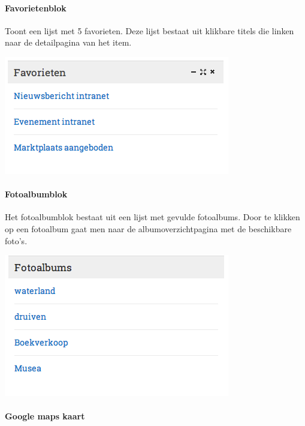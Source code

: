 \paragraph{Favorietenblok}

Toont een lijst met 5 favorieten. Deze lijst bestaat uit klikbare titels die linken naar de detailpagina van het item.

\begin{center}
	\includegraphics[scale=0.5]{img/blokken/favorieten.png}
\end{center}

\paragraph{Fotoalbumblok}\label{fotoalbumblok}

Het fotoalbumblok bestaat uit een lijst met gevulde fotoalbums. Door te klikken op een fotoalbum gaat men naar de albumoverzichtpagina met de beschikbare foto's.

\begin{center}
	\includegraphics[scale=0.5]{img/blokken/fotoalbum.png}
\end{center}

\paragraph{Google maps kaart}

